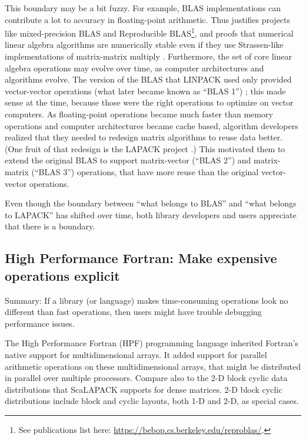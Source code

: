 This boundary may be a bit fuzzy.  For example, BLAS implementations
can contribute a lot to accuracy in floating-point arithmetic.  Thus
justifies projects like mixed-precision BLAS \cite{lawn149} and
Reproducible BLAS\footnote{See publications list here:
  \url{https://bebop.cs.berkeley.edu/reproblas/}.}, and proofs that
numerical linear algebra algorithms are numerically stable even if
they use Strassen-like implementations of matrix-matrix multiply
\cite{demmel2007fast}.  Furthermore, the set of core linear algebra
operations may evolve over time, as computer architectures and
algorithms evolve.  The version of the BLAS that LINPACK used only
provided vector-vector operations (what later became known as ``BLAS
1'') \cite{lawson1979blas}; this made sense at the time, because those
were the right operations to optimize on vector computers.  As
floating-point operations became much faster than memory operations
\cite{wulf1995hitting} and computer architectures became cache based,
algorithm developers realized that they needed to redesign matrix
algorithms to reuse data better.  (One fruit of that redesign is the
LAPACK project \cite{anderson1990lapack}.)  This motivated them to
extend the original BLAS to support matrix-vector
\cite{dongarra1988blas2} (``BLAS 2'') and matrix-matrix
\cite{dongarra1990blas3} (``BLAS 3'') operations, that have more reuse
than the original vector-vector operations.

Even though the boundary between ``what belongs to BLAS'' and ``what
belongs to LAPACK'' has shifted over time, both library developers and
users appreciate that there is a boundary.

\subsection{High Performance Fortran: Make expensive operations
  explicit}\label{SS:other-langs:HPF}

Summary: If a library (or language) makes time-consuming operations
look no different than fast operations, then users might have trouble
debugging performance issues.

The High Performance Fortran (HPF) programming language
\cite{Kennedy2007,Kennedy2011} inherited Fortran's native support for
multidimensional arrays.  It added support for parallel arithmetic
operations on these multidimensional arrays, that might be distributed
in parallel over multiple processors.  Compare also to the 2-D block
cyclic data distributions that ScaLAPACK \cite{Blackford1997} supports
for dense matrices.  2-D block cyclic distributions include block and
cyclic layouts, both 1-D and 2-D, as special cases.

